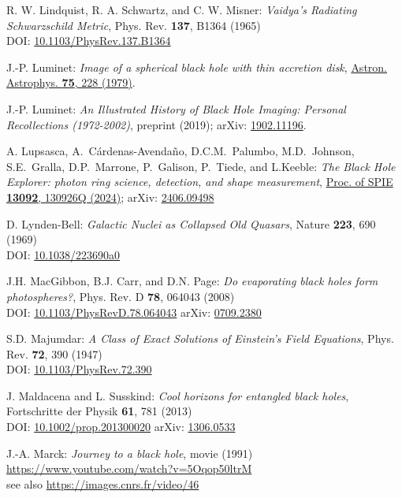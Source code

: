 \begin{thebibliography}{123}
R. W. Lindquist, R. A. Schwartz, and C. W. Misner:
{\em Vaidya's Radiating Schwarzschild Metric},
Phys. Rev. {\bf 137}, B1364 (1965)\\
DOI: \href{https://doi.org/10.1103/PhysRev.137.B1364}{10.1103/PhysRev.137.B1364}

J.-P. Luminet: {\em Image of a spherical black hole with thin accretion disk},
\href{http://adsabs.harvard.edu/abs/1979A%26A....75..228L}{Astron. Astrophys. {\bf 75}, 228 (1979)}.

J.-P. Luminet:
{\em An Illustrated History of Black Hole Imaging: Personal Recollections (1972-2002)}, preprint (2019);
arXiv: \href{https://arxiv.org/abs/1902.11196}{1902.11196}.

A. Lupsasca, A.~Cárdenas-Avendaño, D.C.M.~Palumbo, M.D.~Johnson, S.E.~Gralla, D.P.~Marrone, P.~Galison, P.~Tiede, and L.Keeble:
{\em The Black Hole Explorer: photon ring science, detection, and shape measurement},
\href{https://doi.org/10.1117/12.3019437}{Proc. of SPIE {\bf 13092}, 130926Q (2024)};
arXiv: \href{https://arxiv.org/abs/2406.09498}{2406.09498}

D. Lynden-Bell:
{\em Galactic Nuclei as Collapsed Old Quasars},
Nature {\bf 223}, 690 (1969)\\
DOI: \href{https://doi.org/10.1038/223690a0}{10.1038/223690a0}

J.H. MacGibbon, B.J. Carr, and D.N. Page:
{\em Do evaporating black holes form photospheres?},
Phys. Rev. D {\bf 78}, 064043 (2008)\\
DOI: \href{https://doi.org/10.1103/PhysRevD.78.064043}{10.1103/PhysRevD.78.064043}\hfill
arXiv: \href{https://arxiv.org/abs/0709.2380}{0709.2380}

S.D. Majumdar:
{\em A Class of Exact Solutions of Einstein's Field Equations},
Phys. Rev. {\bf 72}, 390 (1947)\\
DOI: \href{https://doi.org/10.1103/PhysRev.72.390}{10.1103/PhysRev.72.390}

J. Maldacena and L. Susskind:
{\em Cool horizons for entangled black holes},
Fortschritte der Physik {\bf 61}, 781 (2013)\\
DOI: \href{https://doi.org/10.1002/prop.201300020}{10.1002/prop.201300020}\hfill
arXiv: \href{https://arxiv.org/abs/1306.0533}{1306.0533}

J.-A. Marck:
{\em Journey to a black hole}, movie (1991)\\
\url{https://www.youtube.com/watch?v=5Oqop50ltrM}\\
see also \url{https://images.cnrs.fr/video/46}


\end{thebibliography}
